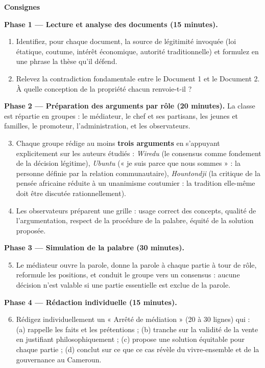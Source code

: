 \documentclass[11pt]{article}
\newcommand{\cle}[1]{{\popxbold\color{popdark}#1}}
\begin{document}
\textbf{Consignes}

\textbf{Phase 1 — Lecture et analyse des documents (15 minutes).}

\begin{enumerate}
\item Identifiez, pour chaque document, la \cle{source de légitimité} invoquée (loi étatique, coutume, intérêt économique, autorité traditionnelle) et formulez en une phrase la thèse qu'il défend.
\item Relevez la contradiction fondamentale entre le Document 1 et le Document 2. À quelle conception de la propriété chacun renvoie-t-il ?
\end{enumerate}

\textbf{Phase 2 — Préparation des arguments par rôle (20 minutes).} La classe est répartie en groupes : le médiateur, le chef et ses partisans, les jeunes et familles, le promoteur, l'administration, et les observateurs.

\begin{enumerate}
\setcounter{enumi}{2}
\item Chaque groupe rédige au moins \textbf{trois arguments} en s'appuyant explicitement sur les auteurs étudiés : \emph{Wiredu} (le consensus comme fondement de la décision légitime), \emph{Ubuntu} (« je suis parce que nous sommes » : la personne définie par la relation communautaire), \emph{Hountondji} (la critique de la pensée africaine réduite à un unanimisme coutumier : la tradition elle-même doit être discutée rationnellement).
\item Les observateurs préparent une grille : usage correct des concepts, qualité de l'argumentation, respect de la procédure de la palabre, équité de la solution proposée.
\end{enumerate}

\textbf{Phase 3 — Simulation de la palabre (30 minutes).}

\begin{enumerate}
\setcounter{enumi}{4}
\item Le médiateur ouvre la parole, donne la parole à chaque partie à tour de rôle, reformule les positions, et conduit le groupe vers un \cle{consensus} : aucune décision n'est valable si une partie essentielle est exclue de la parole.
\end{enumerate}

\textbf{Phase 4 — Rédaction individuelle (15 minutes).}

\begin{enumerate}
\setcounter{enumi}{5}
\item Rédigez individuellement un « Arrêté de médiation » (20 à 30 lignes) qui : (a) rappelle les faits et les prétentions ; (b) tranche sur la validité de la vente en justifiant philosophiquement ; (c) propose une solution équitable pour chaque partie ; (d) conclut sur ce que ce cas révèle du vivre-ensemble et de la gouvernance au Cameroun.
\end{enumerate}
\end{document}
